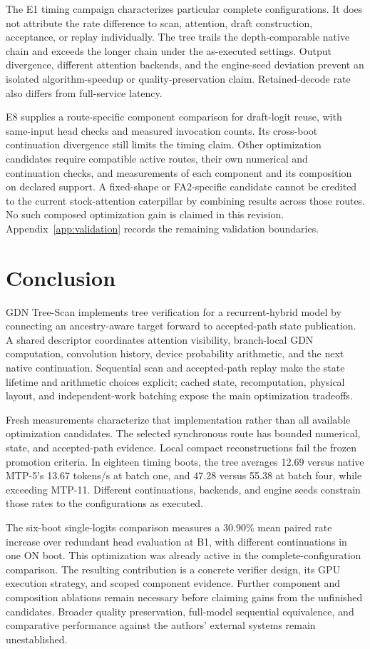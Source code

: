 \documentclass[conference]{IEEEtran}
\newcommand{\sys}{GDN Tree-Scan}
\begin{document}
The E1 timing campaign characterizes particular complete configurations. It does not attribute the rate difference to scan, attention, draft construction, acceptance, or replay individually. The tree trails the depth-comparable native chain and exceeds the longer chain under the as-executed settings. Output divergence, different attention backends, and the engine-seed deviation prevent an isolated algorithm-speedup or quality-preservation claim. Retained-decode rate also differs from full-service latency.

E8 supplies a route-specific component comparison for draft-logit reuse, with same-input head checks and measured invocation counts. Its cross-boot continuation divergence still limits the timing claim. Other optimization candidates require compatible active routes, their own numerical and continuation checks, and measurements of each component and its composition on declared support. A fixed-shape or FA2-specific candidate cannot be credited to the current stock-attention caterpillar by combining results across those routes. No such composed optimization gain is claimed in this revision. Appendix~\ref{app:validation} records the remaining validation boundaries.

\section{Conclusion}
\sys{} implements tree verification for a recurrent-hybrid model by connecting an ancestry-aware target forward to accepted-path state publication. A shared descriptor coordinates attention visibility, branch-local GDN computation, convolution history, device probability arithmetic, and the next native continuation. Sequential scan and accepted-path replay make the state lifetime and arithmetic choices explicit; cached state, recomputation, physical layout, and independent-work batching expose the main optimization tradeoffs.

Fresh measurements characterize that implementation rather than all available optimization candidates. The selected synchronous route has bounded numerical, state, and accepted-path evidence. Local compact reconstructions fail the frozen promotion criteria. In eighteen timing boots, the tree averages 12.69 versus native MTP-5's 13.67 tokens/s at batch one, and 47.28 versus 55.38 at batch four, while exceeding MTP-11. Different continuations, backends, and engine seeds constrain those rates to the configurations as executed.

The six-boot single-logits comparison measures a 30.90\% mean paired rate increase over redundant head evaluation at B1, with different continuations in one ON boot. This optimization was already active in the complete-configuration comparison. The resulting contribution is a concrete verifier design, its GPU execution strategy, and scoped component evidence. Further component and composition ablations remain necessary before claiming gains from the unfinished candidates. Broader quality preservation, full-model sequential equivalence, and comparative performance against the authors' external systems remain unestablished.
\end{document}
